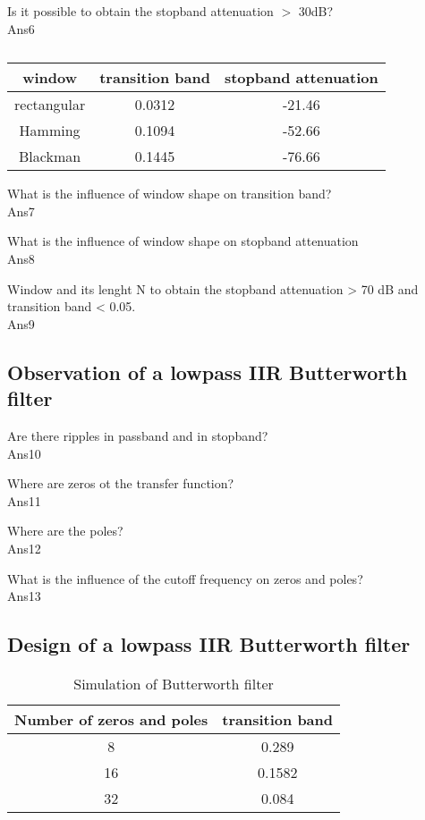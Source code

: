 \documentclass{article}
\begin{document}
Is it possible to obtain the stopband attenuation $>$ 30dB? \\
Ans6

\begin{table}[h!]
  \begin{center}
    \caption{}
    \label{tab:task1tab}
    \begin{tabular}{c|c|c} 
      \textbf{window} & \textbf{transition band} & \textbf{stopband attenuation} \\
      \hline
        rectangular & 0.0312 & -21.46 \\
        Hamming     & 0.1094 & -52.66 \\
        Blackman    & 0.1445 & -76.66 \\
    \end{tabular}
  \end{center}
\end{table}

What is the influence of window shape on transition band? \\
Ans7

What is the influence of window shape on stopband attenuation \\
Ans8

Window and its lenght N to obtain the stopband attenuation > 70 dB and 
transition band < 0.05. \\
Ans9

\subsection*{Observation of a lowpass IIR Butterworth filter}

Are there ripples in passband and in stopband? \\
Ans10

Where are zeros ot the transfer function? \\
Ans11

Where are the poles? \\
Ans12

What is the influence of the cutoff frequency on zeros and poles? \\
Ans13

\subsection*{Design of a lowpass IIR Butterworth filter}
\begin{table}[h!]
  \begin{center}
    \caption{Simulation of Butterworth filter}
    \label{tab:Frequency vs SNRbd}
    \begin{tabular}{c|c} 
      \textbf{Number of zeros and poles} & \textbf{transition band} \\
      \hline
      8 &  0.289 \\
      16 & 0.1582 \\
      32 & 0.084 \\
    \end{tabular}
  \end{center}
\end{table}
\end{document}
